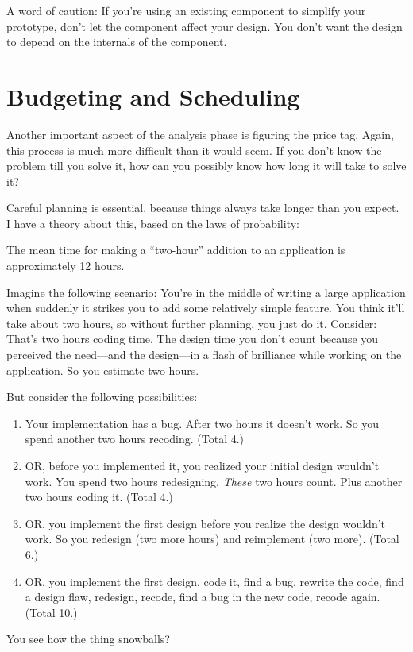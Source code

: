 \noindent A word of caution: If you're using an existing component to
simplify your prototype, don't let the component affect your design.
You don't want the design to depend on the internals of the component.

\section{Budgeting and Scheduling}

Another important aspect of the analysis phase is figuring the price
tag.  Again, this process is much more difficult than it would seem.
If you don't know the problem till you solve it, how can you possibly
know how long it will take to solve it?

Careful planning is essential, because things always take longer than
you expect. I have a theory about this, based on the laws of
probability:



\begin{tip}
The mean time for making a ``two-hour'' addition to an application is
approximately 12 hours.
\end{tip}

\noindent Imagine the following scenario: You're in the middle of
writing a large application when suddenly it strikes you to add some
relatively simple feature. You think it'll take about two hours, so
without further planning, you just do it. Consider: That's two hours
coding time. The design time you don't count because you perceived the
need---and the design---in a flash of brilliance while working on the
application. So you estimate two hours.

But consider the following possibilities:

\begin{enumerate}
\item Your implementation has a bug. After two hours it doesn't work. So you
spend another two hours recoding. (Total 4.)
\item OR, before you implemented it, you realized your initial design wouldn't
work. You spend two hours redesigning. \emph{These} two hours count. Plus
another two hours coding it. (Total 4.)
\item OR, you implement the first design before you realize the design
wouldn't work. So you redesign (two more hours) and reimplement (two
more). (Total 6.)
\item OR, you implement the first design, code it, find a bug, rewrite
the code, find a design flaw, redesign, recode, find a bug in the new
code, recode again. (Total 10.)
\end{enumerate}
You see how the thing snowballs?

